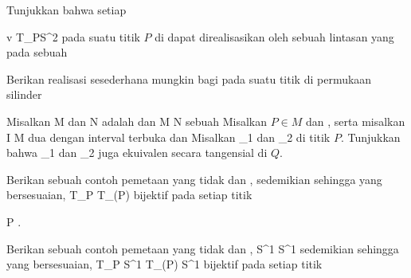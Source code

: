 \setcounter{section}{9}


{}
{

Tunjukkan bahwa setiap

\mavergleichskette
{\vergleichskette
{ v
}
{ \in }{ T_PS^2
}
{  }{
}
{    }{
}
{   }{
}
}
{}{}{}
pada suatu titik $P$ di
dapat direalisasikan oleh sebuah lintasan
yang
pada sebuah

}
{} {}

{}
{

Berikan realisasi sesederhana mungkin bagi
pada suatu titik
 di permukaan silinder

}
{} {}

{}
{

Misalkan
\mathkor {} {M} {dan} {N} {}
adalah
dan
\maabbdisp {\varphi} { M } { N
} {}
sebuah
Misalkan $P \in M$ dan
, serta misalkan
 { I } { M
} {}
dua
dengan interval terbuka
 dan
 Misalkan
\mathkor {} {\gamma_1} {dan} {\gamma_2} {}
di titik $P$.
Tunjukkan bahwa
\mathkor {} {\varphi \circ \gamma_1} {dan} {\varphi \circ \gamma_2} {}
juga ekuivalen secara tangensial di $Q$.

}
{} {}

{}
{

Berikan sebuah contoh pemetaan yang
tidak
dan
,
\maabbdisp {\varphi} {\R} {\R
} {}
sedemikian sehingga
yang bersesuaian,
 {T_P \R} {T_{\varphi(P)} \R
} {}
bijektif pada setiap titik

\mavergleichskette
{\vergleichskette
{ P
}
{ \in }{ \R
}
{  }{
}
{    }{
}
{   }{
}
}
{}{}{.}

}
{} {}

{}
{

Berikan sebuah contoh pemetaan yang
tidak
dan
,
\maabbdisp {\varphi} {S^1} {S^1
} {}
sedemikian sehingga
yang bersesuaian,
 {T_P S^1} {T_{\varphi(P)} S^1
} {}
bijektif pada setiap titik

}
{} {}

